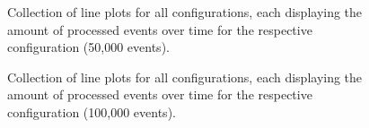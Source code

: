 \begin{figure}[h]
        \caption{Collection of line plots for all configurations, each displaying the amount of processed events over time for the respective configuration (50,000 events).}
        \label{fig:evaluation:performance:config-comparison_50k}
\end{figure}

\begin{figure}[h]
        \caption{Collection of line plots for all configurations, each displaying the amount of processed events over time for the respective configuration (100,000 events).}
        \label{fig:evaluation:performance:config-comparison_100k}
\end{figure}

